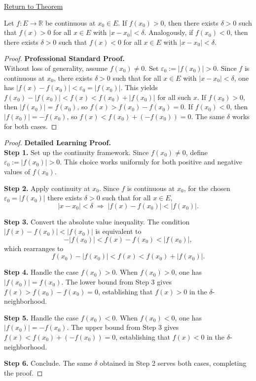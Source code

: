 \newpage
{}
\label{prf:sign-preservation}

\begin{remark*}[Return]
\hyperref[prop:sign-preservation]{Return to Theorem}
\end{remark*}

\begin{theorem*}
Let $f : E \to \mathbb{R}$ be continuous at $x_0 \in E$.
If $f(x_0) > 0$, then there exists $\delta > 0$ such that
$f(x) > 0$ for all $x \in E$ with $|x - x_0| < \delta$.
Analogously, if $f(x_0) < 0$, then there exists $\delta > 0$ such that
$f(x) < 0$ for all $x \in E$ with $|x - x_0| < \delta$.
\end{theorem*}

\begin{proof}
\textbf{Professional Standard Proof.}~\\
Without loss of generality, assume $f(x_0) \neq 0$. Set $\varepsilon_0 := |f(x_0)| > 0$. Since $f$ is continuous at $x_0$, there exists $\delta > 0$ such that for all $x \in E$ with $|x - x_0| < \delta$, one has $|f(x) - f(x_0)| < \varepsilon_0 = |f(x_0)|$. This yields $f(x_0) - |f(x_0)| < f(x) < f(x_0) + |f(x_0)|$ for all such $x$. If $f(x_0) > 0$, then $|f(x_0)| = f(x_0)$, so $f(x) > f(x_0) - f(x_0) = 0$. If $f(x_0) < 0$, then $|f(x_0)| = -f(x_0)$, so $f(x) < f(x_0) + (-f(x_0)) = 0$. The same $\delta$ works for both cases.
\end{proof}

\begin{proof}
\textbf{Detailed Learning Proof.}~\\

\textbf{Step 1.} Set up the continuity framework. Since $f(x_0) \neq 0$, define $\varepsilon_0 := |f(x_0)| > 0$. This choice works uniformly for both positive and negative values of $f(x_0)$.

\textbf{Step 2.} Apply continuity at $x_0$. Since $f$ is continuous at $x_0$, for the chosen $\varepsilon_0 = |f(x_0)|$ there exists $\delta > 0$ such that for all $x \in E$,
\[
  |x - x_0| < \delta \;\Rightarrow\; |f(x) - f(x_0)| < |f(x_0)|.
\]

\textbf{Step 3.} Convert the absolute value inequality. The condition $|f(x) - f(x_0)| < |f(x_0)|$ is equivalent to
\[
  -|f(x_0)| < f(x) - f(x_0) < |f(x_0)|,
\]
which rearranges to
\[
  f(x_0) - |f(x_0)| < f(x) < f(x_0) + |f(x_0)|.
\]

\textbf{Step 4.} Handle the case $f(x_0) > 0$. When $f(x_0) > 0$, one has $|f(x_0)| = f(x_0)$. The lower bound from Step 3 gives $f(x) > f(x_0) - f(x_0) = 0$, establishing that $f(x) > 0$ in the $\delta$-neighborhood.

\textbf{Step 5.} Handle the case $f(x_0) < 0$. When $f(x_0) < 0$, one has $|f(x_0)| = -f(x_0)$. The upper bound from Step 3 gives $f(x) < f(x_0) + (-f(x_0)) = 0$, establishing that $f(x) < 0$ in the $\delta$-neighborhood.

\textbf{Step 6.} Conclude. The same $\delta$ obtained in Step 2 serves both cases, completing the proof.
\end{proof}

